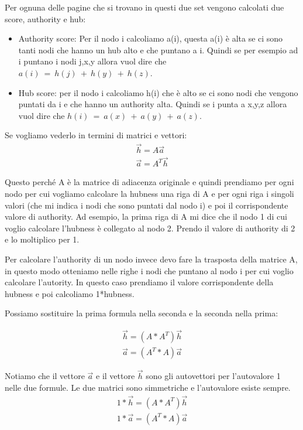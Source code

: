 \documentclass[14pt]{extreport}
\begin{document}
Per ognuna delle pagine che si trovano in questi due set vengono calcolati due score, authority e hub:
\begin{itemize}
    \item Authority score: Per il nodo i calcoliamo a(i), questa a(i) è alta se ci sono tanti nodi che hanno un hub alto e che puntano a i. Quindi se per esempio ad i puntano i nodi j,x,y allora vuol dire che $a(i)\ =\ h(j)\ +\ h(y)\ +\ h(z)$.
    \item Hub score: per il nodo i calcoliamo h(i) che è alto se ci sono nodi che vengono puntati da i e che hanno un authority alta. Quindi se i punta a x,y,z allora vuol dire che $h(i)\ =\ a(x)\ +\ a(y)\ +\ a(z)$.
\end{itemize}

Se vogliamo vederlo in termini di matrici e vettori:
\newline
\begin{equation}
\begin{split}
    \vec{h} = A\vec{a}\\
    \vec{a} = A^T\vec{h}
\end{split}
\end{equation}

Questo perché A è la matrice di adiacenza originale e quindi prendiamo per ogni nodo per cui vogliamo calcolare la hubness una riga di A e per ogni riga i singoli valori (che mi indica i nodi che sono puntati dal nodo i) e poi il corrispondente valore di authority.
Ad esempio, la prima riga di A mi dice che il nodo 1 di cui voglio calcolare l'hubness è collegato al nodo 2. Prendo il valore di authority di 2 e lo moltiplico per 1.

Per calcolare l'authority di un nodo invece devo fare la trasposta della matrice A, in questo modo otteniamo nelle righe i nodi che puntano al nodo i per cui voglio calcolare l'autority. In questo caso prendiamo il valore corrispondente della hubness e poi calcoliamo 1*hubness.       

Possiamo sostituire la prima formula nella seconda e la seconda nella prima:

\begin{equation}
\begin{split}
    \vec{h} = (A*A^T)\vec{h}\\
    \vec{a} = (A^T*A)\vec{a}
\end{split}
\end{equation}

Notiamo che il vettore $\vec{a}$ e il vettore $\vec{h}$ sono gli autovettori per l'autovalore 1 nelle due formule.
Le due matrici sono simmetriche e l'autovalore esiste sempre.
\begin{equation}
\begin{split}
    1*\vec{h} = (A*A^T)\vec{h}\\
    1*\vec{a} = (A^T*A)\vec{a}
\end{split}
\end{equation}
\end{document}
